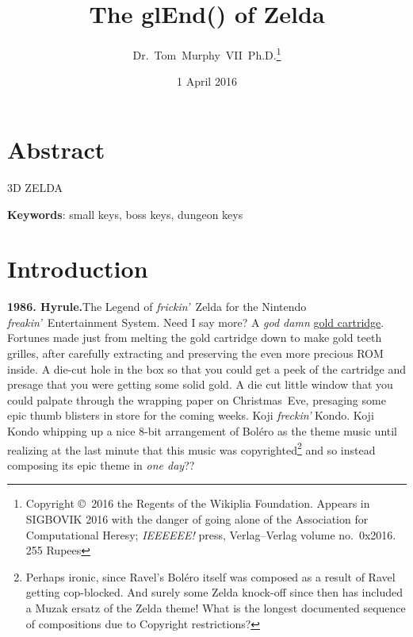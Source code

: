 \documentclass[twocolumn]{article}
\begin{document}
 

\title{The glEnd() of Zelda}
\author{Dr.~Tom~Murphy~VII~Ph.D.\thanks{
    Copyright \copyright\ 2016 the Regents of the Wikiplia Foundation.
    Appears in SIGBOVIK 2016 with the danger of going alone of the
    Association for Computational Heresy; {\em IEEEEEE!} press,
    Verlag--Verlag volume no.~0x2016. 255 Rupees} }

\renewcommand\>{$>$}
\newcommand\<{$<$}

\date{1 April 2016}

\maketitle

\section*{Abstract}
3D ZELDA

\vspace{1em}
{\noindent \small {\bf Keywords}:
  small keys, boss keys, dungeon keys
}

\section{Introduction}

{\bf 1986. Hyrule.}\quad The Legend of {\it frickin'}~Zelda for the
Nintendo {\it freakin'}~Entertainment System. Need I say more? A {\it
  god damn} \uline{gold cartridge}. Fortunes made just from melting
the gold cartridge down to make gold teeth grilles, after carefully
extracting and preserving the even more precious ROM inside. A die-cut hole in the
box so that you could get a peek of the cartridge and presage that you
were getting some solid gold. A die cut little window that you could
palpate through the wrapping paper on Christmas~Eve, presaging some
epic thumb blisters in store for the coming weeks. Koji {\it freckin'}
Kondo. Koji Kondo whipping up a nice 8-bit arrangement of Bol\'ero as
the theme music until realizing at the last minute that this music was
copyrighted\footnote{Perhaps ironic, since Ravel's {Bol\'ero} itself
  was composed as a result of Ravel getting
  cop-blocked.\cite{wikipedia2016bolero} And surely some Zelda
  knock-off since then has included a Muzak ersatz of the Zelda theme!
  What is the longest documented sequence of compositions due to
  Copyright restrictions?} and so instead composing its epic theme in
{\it one day}??
\end{document}
